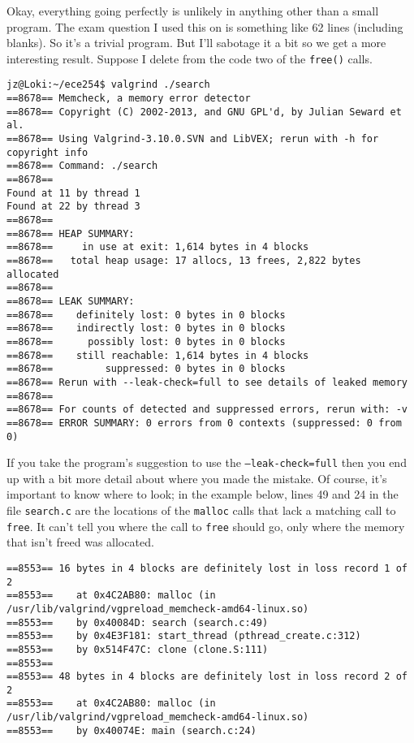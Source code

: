 Okay, everything going perfectly is unlikely in anything other than a small program. The exam question I used this on is something like 62 lines (including blanks). So it's a trivial program. But I'll sabotage it a bit so we get a more interesting result. Suppose I delete from the code two of the \texttt{free()} calls.

\begin{verbatim}
jz@Loki:~/ece254$ valgrind ./search 
==8678== Memcheck, a memory error detector
==8678== Copyright (C) 2002-2013, and GNU GPL'd, by Julian Seward et al.
==8678== Using Valgrind-3.10.0.SVN and LibVEX; rerun with -h for copyright info
==8678== Command: ./search
==8678== 
Found at 11 by thread 1 
Found at 22 by thread 3 
==8678== 
==8678== HEAP SUMMARY:
==8678==     in use at exit: 1,614 bytes in 4 blocks
==8678==   total heap usage: 17 allocs, 13 frees, 2,822 bytes allocated
==8678== 
==8678== LEAK SUMMARY:
==8678==    definitely lost: 0 bytes in 0 blocks
==8678==    indirectly lost: 0 bytes in 0 blocks
==8678==      possibly lost: 0 bytes in 0 blocks
==8678==    still reachable: 1,614 bytes in 4 blocks
==8678==         suppressed: 0 bytes in 0 blocks
==8678== Rerun with --leak-check=full to see details of leaked memory
==8678== 
==8678== For counts of detected and suppressed errors, rerun with: -v
==8678== ERROR SUMMARY: 0 errors from 0 contexts (suppressed: 0 from 0)
\end{verbatim}

If you take the program's suggestion to use the \texttt{--leak-check=full} then you end up with a bit more detail about where you made the mistake. Of course, it's important to know where to look; in the example below, lines 49 and 24 in the file \texttt{search.c} are the locations of the \texttt{malloc} calls that lack a matching call to \texttt{free}. It can't tell you where the call to \texttt{free} should go, only where the memory that isn't freed was allocated.

\begin{verbatim}
==8553== 16 bytes in 4 blocks are definitely lost in loss record 1 of 2
==8553==    at 0x4C2AB80: malloc (in /usr/lib/valgrind/vgpreload_memcheck-amd64-linux.so)
==8553==    by 0x40084D: search (search.c:49)
==8553==    by 0x4E3F181: start_thread (pthread_create.c:312)
==8553==    by 0x514F47C: clone (clone.S:111)
==8553== 
==8553== 48 bytes in 4 blocks are definitely lost in loss record 2 of 2
==8553==    at 0x4C2AB80: malloc (in /usr/lib/valgrind/vgpreload_memcheck-amd64-linux.so)
==8553==    by 0x40074E: main (search.c:24)

\end{verbatim}


